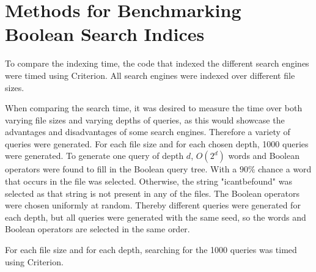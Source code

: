 \section{Methods for Benchmarking Boolean Search Indices}
To compare the indexing time, the code that indexed the different search engines were timed using Criterion. All search engines were indexed over different file sizes.

When comparing the search time, it was desired to measure the time over both varying file sizes and varying depths of queries, as this would showcase the advantages and disadvantages of some search engines. Therefore a variety of queries were generated. For each file size and for each chosen depth, 1000 queries were generated. To generate one query of depth $d$, $O(2^d)$ words and Boolean operators were found to fill in the Boolean query tree. With a $90\%$ chance a word that occurs in the file was selected. Otherwise, the string "icantbefound" was selected as that string is not present in any of the files. The Boolean operators were chosen uniformly at random. Thereby different queries were generated for each depth, but all queries were generated with the same seed, so the words and Boolean operators are selected in the same order.

For each file size and for each depth, searching for the 1000 queries was timed using Criterion.

